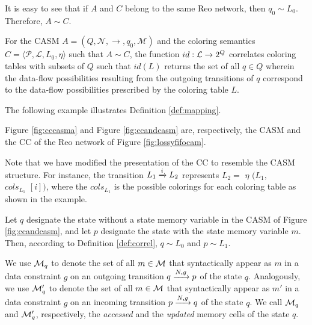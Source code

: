 It is easy to see that if $A$ and $C$ belong to the same Reo network, then $q_0 \sim L_0$. Therefore, $A \sim C$.

\begin{definition}[$id$ mapping]
\label{def:mapping}
For the CASM $A=\left(Q, \mathcal{N}, \rightarrow, q_0, \mathcal{M}\right)$ and the coloring semantics $C=\langle \mathcal{P}, \mathcal{L}, L_0, \eta \rangle$ such that $A \sim C$, the function $id: {\cal L} \rightarrow 2^Q$ correlates coloring tables with subsets of $Q$ such that $id(L)$ returns the set of all $q \in Q$ wherein the data-flow possibilities resulting from the outgoing transitions of $q$ correspond to the data-flow possibilities prescribed by the coloring table $L$.
\end{definition}

The following example illustrates Definition \ref{def:mapping}.

\begin{BehExample} Figure \ref{fig:cccasma} and Figure \ref{fig:ccandcasm} are, respectively, the CASM and the CC of the Reo network of Figure \ref{fig:lossyfifocam}.


Note that we have modified the presentation of the CC to resemble the CASM structure. For instance, the transition $L_1\xrightarrow{i}L_2$ represents $L_2 = $ $\eta$ $(L_1,$ \\
$ cols_{L_1}$ $[i])$, where the $cols_{L_1}$ is the possible colorings for each coloring table as shown in the example. 

        
         
         \noindent
         Let $q$ designate the state without a state memory variable in the CASM of Figure \ref{fig:ccandcasm}, and let $p$ designate the state with the state memory variable $m$. Then, according to Definition \ref{def:correl}, $q \sim L_0$ and $p \sim L_1$.
\end{BehExample}
 
\begin{definition}
We use ${\cal M}_q$ to denote the set of all $m \in {\cal M}$ that syntactically appear as $m$ in a data constraint $g$ on an  outgoing transition $q \xrightarrow{N, g} p$ of the state $q$.  Analogously, we use ${\cal M}'_q$ to denote the set of all $m \in {\cal M}$ that syntactically appear as $m'$ in a data constraint $g$ on an incoming transition $p \xrightarrow{N, g} q$ of the state $q$.  We call ${\cal M}_q$  and ${\cal M}'_q$, respectively, the \emph{accessed} and the \emph{updated} memory cells of the state $q$.
\end{definition}

